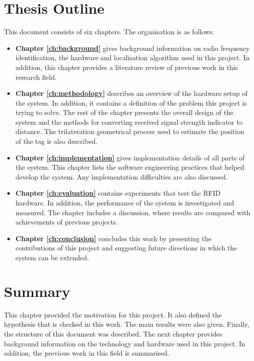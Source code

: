 \section{Thesis Outline}

This document consists of six chapters. The organisation is as follows:
\begin{itemize}
\item \textbf{Chapter \ref{ch:background}} gives background information on radio frequency identification, the hardware and  localisation algorithm used in this project. In addition, this chapter provides a literature review of previous work in this research field.
\item \textbf{Chapter \ref{ch:methodology}} describes an overview of the hardware setup of the system. In addition, it contains a definition of the problem this project is trying to solve. The rest of the chapter presents the overall design of the system and the methods for converting received signal strength indicator to distance. The trilateration geometrical process used to estimate the position of the tag is also described.
\item \textbf{Chapter \ref{ch:implementation}} gives implementation details of all parts of the system. This chapter lists the software engineering practices that helped develop the system. Any implementation difficulties are also discussed.
\item \textbf{Chapter \ref{ch:evaluation}} contains experiments that test the RFID hardware. In addition, the performance of the system is investigated and measured. The chapter includes a discussion, where results are compared with achievements of previous projects.
\item \textbf{Chapter \ref{ch:conclusion}} concludes this work by presenting the contributions of this project and suggesting future directions in which the system can be extended.
\end{itemize}

\section{Summary}

This chapter provided the motivation for this project. It also defined the hypothesis that is checked in this work. The main results were also given. Finally, the structure of this document was described. The next chapter provides background information on the technology and hardware used in this project. In addition, the previous work in this field is summarised.
